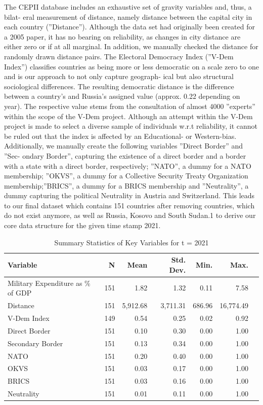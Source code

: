 \documentclass[12pt,a4paper]{article}
\begin{document}
\pagebreak
The CEPII database includes an exhaustive set of gravity variables and, thus, a bilat- eral measurement of distance, namely distance between the capital city in each country (”Distance”). Although the data set had originally been created for a 2005 paper, it has no bearing on reliability, as changes in city distance are either zero or if at all marginal. In addition, we manually checked the distance for randomly drawn distance pairs.
The Electoral Democracy Index (”V-Dem Index”) classifies countries as being more or less democratic on a scale zero to one and is our approach to not only capture geograph- ical but also structural sociological differences. The resulting democratic distance is the difference between a country’s and Russia’s assigned value (approx. 0.22 depending on year). The respective value stems from the consultation of almost 4000 ”experts” within the scope of the V-Dem project. Although an attempt within the V-Dem project is made to select a diverse sample of individuals w.r.t reliability, it cannot be ruled out that the index is affected by an Educational- or Western-bias.
Additionally, we manually create the following variables ”Direct Border” and ”Sec- ondary Border”, capturing the existence of a direct border and a border with a state with a direct border, respectively; ”NATO”, a dummy for a NATO membership; ”OKVS”, a dummy for a Collective Security Treaty Organization membership;”BRICS”, a dummy for a BRICS membership and ”Neutrality”, a dummy capturing the political Neutrality in Austria and Switzerland.
This leads to our final dataset which contains 151 countries after removing countries,
which do not exist anymore, as well as Russia, Kosovo and South Sudan.1 to derive our core data structure for the given time stamp 2021.

\begin{table}[h]
\label{t:1}
\caption{Summary Statistics of Key Variables for t = 2021}
\begin{tabular}{lrrrrrr}
\hline \hline
Variable & N & Mean & Std. Dev. & Min. & Max. \\ \hline
Military Expenditure as \% of GDP & 151 & 1.82 & 1.32 & 0.11 & 7.58 \\
Distance &   151  &  5,912.68 &   3,711.31 & 686.96 &  16,774.49 \\
V-Dem Index & 149 & 0.54& 0.25 & 0.02 & 0.92 \\
Direct Border & 151 & 0.10 & 0.30 & 0.00 & 1.00 \\
Secondary Border & 151 & 0.13 & 0.34 & 0.00 &          1.00 \\
NATO & 151& 0.20 & 0.40 & 0.00 & 1.00 \\         
OKVS & 151 & 0.03  & 0.17 & 0.00 & 1.00 \\
BRICS & 151  & 0.03 & 0.16 & 0.00 & 1.00 \\          
Neutrality & 151   &  0.01 &   0.11 & 0.00 & 1.00 \\     \hline\hline
\end{tabular}
\end{table}
 
\end{document}
